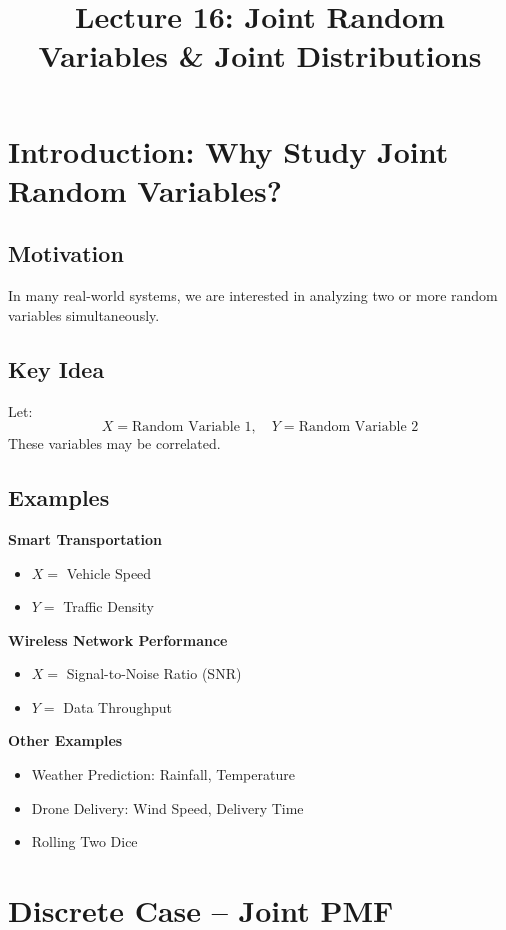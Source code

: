 \documentclass[11pt]{article}
\begin{document}
\title{\textbf{Lecture 16: Joint Random Variables \& Joint Distributions}}
\author{}
\date{}
\maketitle

\section{Introduction: Why Study Joint Random Variables?}

\subsection{Motivation}
In many real-world systems, we are interested in analyzing two or more random variables simultaneously.

\subsection{Key Idea}
Let:
\[
X = \text{Random Variable 1}, \quad Y = \text{Random Variable 2}
\]
These variables may be correlated.

\subsection{Examples}

\textbf{Smart Transportation}
\begin{itemize}
    \item $X =$ Vehicle Speed
    \item $Y =$ Traffic Density
\end{itemize}

\textbf{Wireless Network Performance}
\begin{itemize}
    \item $X =$ Signal-to-Noise Ratio (SNR)
    \item $Y =$ Data Throughput
\end{itemize}

\textbf{Other Examples}
\begin{itemize}
    \item Weather Prediction: Rainfall, Temperature
    \item Drone Delivery: Wind Speed, Delivery Time
    \item Rolling Two Dice
\end{itemize}

\section{Discrete Case -- Joint PMF}
\end{document}
